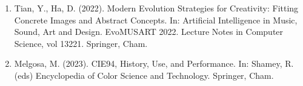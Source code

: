 \begin{enumerate}\small
    \item[{[1]}]\label{litA} Tian, Y., Ha, D. (2022). Modern Evolution Strategies for Creativity: Fitting Concrete Images and Abstract Concepts. In: Artificial Intelligence in Music, Sound, Art and Design. EvoMUSART 2022. Lecture Notes in Computer Science, vol 13221. Springer, Cham.
    \item[{[2]}]\label{litB} Melgosa, M. (2023). CIE94, History, Use, and Performance. In: Shamey, R. (eds) Encyclopedia of Color Science and Technology. Springer, Cham.
\end{enumerate}

